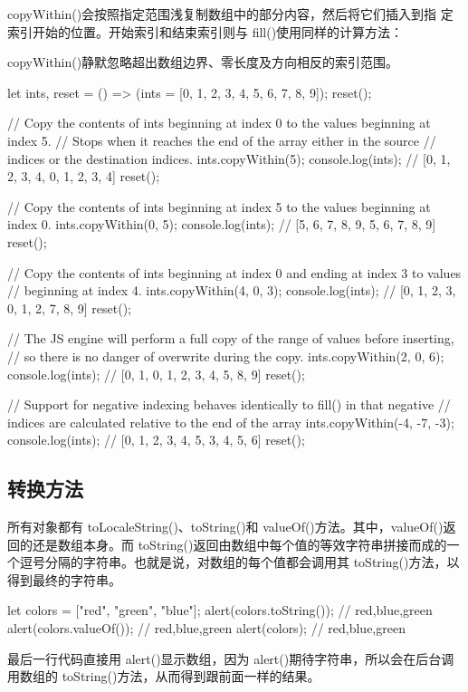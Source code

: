 copyWithin()会按照指定范围浅复制数组中的部分内容，然后将它们插入到指
定索引开始的位置。开始索引和结束索引则与 fill()使用同样的计算方法：

copyWithin()静默忽略超出数组边界、零长度及方向相反的索引范围。
\begin{js}
let ints,
reset = () => (ints = [0, 1, 2, 3, 4, 5, 6, 7, 8, 9]);
reset();

// Copy the contents of ints beginning at index 0 to the values beginning at index 5.
// Stops when it reaches the end of the array either in the source
// indices or the destination indices.
ints.copyWithin(5);
console.log(ints); // [0, 1, 2, 3, 4, 0, 1, 2, 3, 4]
reset();

// Copy the contents of ints beginning at index 5 to the values beginning at index 0.
ints.copyWithin(0, 5);
console.log(ints); // [5, 6, 7, 8, 9, 5, 6, 7, 8, 9]
reset();

// Copy the contents of ints beginning at index 0 and ending at index 3 to values
// beginning at index 4.
ints.copyWithin(4, 0, 3);
console.log(ints); // [0, 1, 2, 3, 0, 1, 2, 7, 8, 9]
reset();

// The JS engine will perform a full copy of the range of values before inserting,
// so there is no danger of overwrite during the copy.
ints.copyWithin(2, 0, 6);
console.log(ints); // [0, 1, 0, 1, 2, 3, 4, 5, 8, 9]
reset();

// Support for negative indexing behaves identically to fill() in that negative
// indices are calculated relative to the end of the array
ints.copyWithin(-4, -7, -3);
console.log(ints); // [0, 1, 2, 3, 4, 5, 3, 4, 5, 6]
reset();

\end{js}
\subsection{转换方法}
所有对象都有 toLocaleString()、toString()和 valueOf()方法。其中，valueOf()返回的还是数组本身。而 toString()返回由数组中每个值的等效字符串拼接而成的一个逗号分隔的字符串。也就是说，对数组的每个值都会调用其 toString()方法，以得到最终的字符串。
\begin{js}
let colors = ["red", "green", "blue"];
alert(colors.toString()); // red,blue,green
alert(colors.valueOf()); // red,blue,green
alert(colors); // red,blue,green
\end{js}

最后一行代码直接用 alert()显示数组，因为 alert()期待字符串，所以会在后台调用数组的 toString()方法，从而得到跟前面一样的结果。

